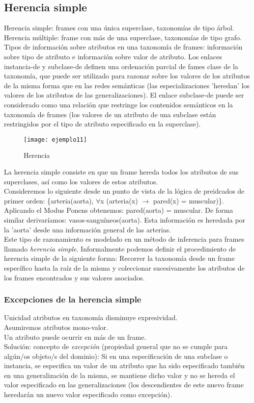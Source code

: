 \documentclass[12pt]{article}
\begin{document}
\subsection{Herencia simple}
Herencia simple: frames con una única superclase, taxonomías de tipo árbol. Herencia múltiple: frame con más de una superclase, taxonomías de tipo grafo. Tipos de información sobre atributos en una taxonomía de frames: información sobre tipo de atributo e información sobre valor de atributo. Los enlaces instancia-de y subclase-de definen una ordenación parcial de fames clase de la taxonomía, que puede ser utilizado para razonar sobre los valores de los atributos de la misma forma que en las redes semánticas (las especializaciones 'heredan' los valores de los atributos de las generalizaciones). El enlace subclase-de puede ser considerado como una relación que restringe los contenidos semánticos en la taxonomía de frames (los valores de un atributo de una subclase están restringidos por el tipo de atributo especificado en la superclase).

\begin{figure}[H]
\centering
\texttt{[image: ejemplo11]}
\caption{Herencia}
\label{fig:ejemplo11}
\end{figure}

La herencia simple consiste en que un frame hereda todos los atributos de sus superclases, así como los valores de estos atributos.\\
Consideremos lo siguiente desde un punto de vista de la lógica de preidcados de primer orden: \{arteria(aorta), $\forall$x (arteria(x) $\rightarrow$ pared(x) = muscular)\}. Aplicando el Modus Ponens  obtenemos: pared(aorta) = muscular. De forma similar derivaríamos: vasos-sanguíneos(aorta). Esta información es heredada por la 'aorta' desde una información general de las arterias.\\
Este tipo de razonamiento es modelado en un método de inferencia para frames llamado \textit{herencia simple}. Informalmente podemos definir el procedimiento de herencia simple de la siguiente forma: Recorrer la taxonomía desde un frame específico hasta la raíz de la misma y coleccionar sucesivamente los atributos de los frames encontrados y sus valores asociados.

\subsubsection{Excepciones de la herencia simple}
Unicidad atributos en taxonomía disminuye expresividad.\\
Asumiremos atributos mono-valor.\\
Un atributo puede ocurrir en más de un frame.\\
Solución: concepto de \textit{excepción} (propiedad general que no se cumple para algún/os objeto/s del dominio): Si en una especificación de una subclase o instancia, se especifica un valor de un atributo que ha sido especificado también en una generalización de la misma, se mantiene dicho valor y no se hereda el valor especificado en las generalizaciones (los descendientes de este nuevo frame heredarán un nuevo valor especificado como excepción).
\end{document}
